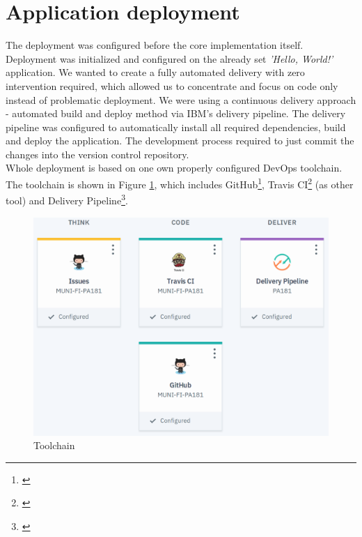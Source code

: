 \documentclass[11pt,a4paper]{article}
\begin{document}
\section{Application deployment}

The deployment was configured before the core implementation itself. Deployment was initialized and configured on the already set \textit{'Hello, World!'} application. We wanted to create a fully automated delivery with zero intervention required, which allowed us to concentrate and focus on code only instead of problematic deployment. We were using a continuous delivery approach - automated build and deploy method via IBM's delivery pipeline. The delivery pipeline was configured to automatically install all required dependencies, build and deploy the application. The development process required to just commit the changes into the version control repository.\\

Whole deployment is based on one own properly configured DevOps toolchain. The toolchain is shown in Figure \ref{fig:toolchain}, which includes GitHub\footnote{\href{https://console.bluemix.net/docs/services/ContinuousDelivery/toolchains\_integrations.html\#github}{\color{urlColor}{console.bluemix.net/docs/services/ContinuousDelivery/toolchains\_integrations.html\#github}}}, Travis CI\footnote{\href{https://console.bluemix.net/docs/services/ContinuousDelivery/toolchains\_integrations.html\#othertool}{\color{urlColor}{console.bluemix.net/docs/services/ContinuousDelivery/toolchains\_integrations.html\#othertool}}} (as other tool) and Delivery Pipeline\footnote{\href{https://console.bluemix.net/docs/services/ContinuousDelivery/toolchains\_integrations.html\#deliverypipeline}{\color{urlColor}{console.bluemix.net/docs/services/ContinuousDelivery/toolchains\_integrations.html\#deliverypipeline}}}.

\begin{figure}[H]
    \centering
    \includegraphics[scale=0.3]{img/toolchain.png}
    \caption{Toolchain}
    \label{fig:toolchain}
\end{figure}
\end{document}
